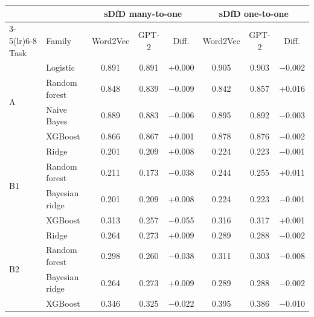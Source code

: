 \begin{tabular}{llcccccc}
\toprule
 & & \multicolumn{3}{c}{sDfD many-to-one} & \multicolumn{3}{c}{sDfD one-to-one} \\
\cmidrule(lr){3-5}\cmidrule(lr){6-8}
Task & Family & Word2Vec & GPT-2 & Diff. & Word2Vec & GPT-2 & Diff. \\
\midrule
\multirow{4}{*}{A} & Logistic & 0.891 & 0.891 & +0.000 & 0.905 & 0.903 & $-$0.002 \\
 & Random forest & 0.848 & 0.839 & $-$0.009 & 0.842 & 0.857 & +0.016 \\
 & Naive Bayes & 0.889 & 0.883 & $-$0.006 & 0.895 & 0.892 & $-$0.003 \\
 & XGBoost & 0.866 & 0.867 & +0.001 & 0.878 & 0.876 & $-$0.002 \\
\midrule
\multirow{4}{*}{B1} & Ridge & 0.201 & 0.209 & +0.008 & 0.224 & 0.223 & $-$0.001 \\
 & Random forest & 0.211 & 0.173 & $-$0.038 & 0.244 & 0.255 & +0.011 \\
 & Bayesian ridge & 0.201 & 0.209 & +0.008 & 0.224 & 0.223 & $-$0.001 \\
 & XGBoost & 0.313 & 0.257 & $-$0.055 & 0.316 & 0.317 & +0.001 \\
\midrule
\multirow{4}{*}{B2} & Ridge & 0.264 & 0.273 & +0.009 & 0.289 & 0.288 & $-$0.002 \\
 & Random forest & 0.298 & 0.260 & $-$0.038 & 0.311 & 0.303 & $-$0.008 \\
 & Bayesian ridge & 0.264 & 0.273 & +0.009 & 0.289 & 0.288 & $-$0.002 \\
 & XGBoost & 0.346 & 0.325 & $-$0.022 & 0.395 & 0.386 & $-$0.010 \\

\bottomrule
\end{tabular}